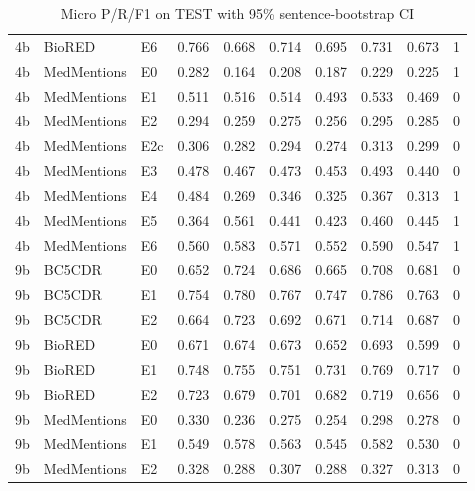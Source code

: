 \begin{table}[t]
\begin{tabular}{llllllllll}
4b & BioRED & E6 & 0.766 & 0.668 & 0.714 & 0.695 & 0.731 & 0.673 & 1 \\
4b & MedMentions & E0 & 0.282 & 0.164 & 0.208 & 0.187 & 0.229 & 0.225 & 1 \\
4b & MedMentions & E1 & 0.511 & 0.516 & 0.514 & 0.493 & 0.533 & 0.469 & 0 \\
4b & MedMentions & E2 & 0.294 & 0.259 & 0.275 & 0.256 & 0.295 & 0.285 & 0 \\
4b & MedMentions & E2c & 0.306 & 0.282 & 0.294 & 0.274 & 0.313 & 0.299 & 0 \\
4b & MedMentions & E3 & 0.478 & 0.467 & 0.473 & 0.453 & 0.493 & 0.440 & 0 \\
4b & MedMentions & E4 & 0.484 & 0.269 & 0.346 & 0.325 & 0.367 & 0.313 & 1 \\
4b & MedMentions & E5 & 0.364 & 0.561 & 0.441 & 0.423 & 0.460 & 0.445 & 1 \\
4b & MedMentions & E6 & 0.560 & 0.583 & 0.571 & 0.552 & 0.590 & 0.547 & 1 \\
9b & BC5CDR & E0 & 0.652 & 0.724 & 0.686 & 0.665 & 0.708 & 0.681 & 0 \\
9b & BC5CDR & E1 & 0.754 & 0.780 & 0.767 & 0.747 & 0.786 & 0.763 & 0 \\
9b & BC5CDR & E2 & 0.664 & 0.723 & 0.692 & 0.671 & 0.714 & 0.687 & 0 \\
9b & BioRED & E0 & 0.671 & 0.674 & 0.673 & 0.652 & 0.693 & 0.599 & 0 \\
9b & BioRED & E1 & 0.748 & 0.755 & 0.751 & 0.731 & 0.769 & 0.717 & 0 \\
9b & BioRED & E2 & 0.723 & 0.679 & 0.701 & 0.682 & 0.719 & 0.656 & 0 \\
9b & MedMentions & E0 & 0.330 & 0.236 & 0.275 & 0.254 & 0.298 & 0.278 & 0 \\
9b & MedMentions & E1 & 0.549 & 0.578 & 0.563 & 0.545 & 0.582 & 0.530 & 0 \\
9b & MedMentions & E2 & 0.328 & 0.288 & 0.307 & 0.288 & 0.327 & 0.313 & 0 \\
\hline
\end{tabular}
\caption{Micro P/R/F1 on TEST with 95\% sentence-bootstrap CI}
\label{tab:classification}
\end{table}
